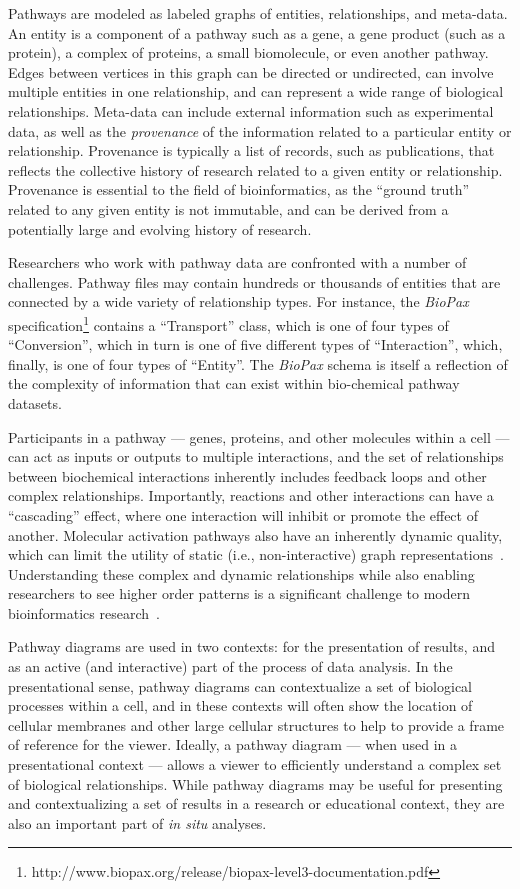 \documentclass[twocolumn]{bmcart}%
\begin{document}
Pathways are modeled as labeled graphs of entities, relationships, and meta-data.
An entity is a component of a pathway such as a gene, a gene product (such as a protein), a complex of proteins, a small biomolecule, or even another pathway.
Edges between vertices in this graph can be directed or undirected, can involve multiple entities in one relationship, and can represent a wide range of biological relationships.
Meta-data can include external information such as experimental data, as well as the \emph{provenance} of the information related to a particular entity or relationship.
Provenance is typically a list of records, such as publications, that reflects the collective history of research related to a given entity or relationship.
Provenance is essential to the field of bioinformatics, as the ``ground truth'' related to any given entity is not immutable, and can be derived from a potentially large and evolving history of research.

Researchers who work with pathway data are confronted with a number of challenges.
Pathway files may contain hundreds or thousands of entities that are connected by a wide variety of relationship types.
For instance, the \emph{BioPax} specification\footnote{http://www.biopax.org/release/biopax-level3-documentation.pdf} contains a ``Transport'' class, which is one of four types of ``Conversion'', which in turn is one of five different types of ``Interaction'', which, finally, is one of four types of ``Entity''.
The \emph{BioPax} schema is itself a reflection of the complexity of information that can exist within bio-chemical pathway datasets.

Participants in a pathway --- genes, proteins, and other molecules within a cell --- can act as inputs or outputs to multiple interactions, and the set of relationships between biochemical interactions inherently includes feedback loops and other complex relationships.
Importantly, reactions and other interactions can have a ``cascading'' effect, where one interaction will inhibit or promote the effect of another.
Molecular activation pathways also have an inherently dynamic quality, which can limit the utility of static (i.e., non-interactive) graph representations~\cite{kitano2002systems}.
Understanding these complex and dynamic relationships while also enabling researchers to see higher order patterns is a significant challenge to modern bioinformatics research~\cite{saraiya2005visualizing}.

Pathway diagrams are used in two contexts: for the presentation of results, and as an active (and interactive) part of the process of data analysis.
In the presentational sense, pathway diagrams can contextualize a set of biological processes within a cell, and in these contexts will often show the location of cellular membranes and other large cellular structures to help to provide a frame of reference for the viewer.
Ideally, a pathway diagram --- when used in a presentational context --- allows a viewer to efficiently understand a complex set of biological relationships.
While pathway diagrams may be useful for presenting and contextualizing a set of results in a research or educational context, they are also an important part of \emph{in situ} analyses.
\end{document}
